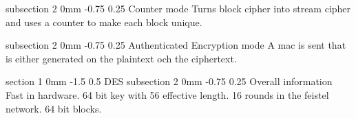 \documentclass[a4paper,11pt]{article}
\makeatletter
\renewcommand{\section}{\@startsection
   {section}%
   {1}%
   {0mm}%
   {-1.5\baselineskip}%
   {0.5\baselineskip}%
   {\sffamily\bfseries\upshape\normalsize}}%
\renewcommand{\subsection}{\@startsection
   {subsection}%
   {2}%
   {0mm}%
   {-0.75\baselineskip}%
   {0.25\baselineskip}%
   {\rmfamily\normalfont\slshape\normalsize}}%
\makeatother
\begin{document}
\subsection{Counter mode}
Turns block cipher into stream cipher and uses a counter to make each block unique. 

\subsection{Authenticated Encryption mode}
A mac is sent that is either generated on the plaintext och the ciphertext. 




\section{DES}
\subsection{Overall information}
Fast in hardware. 64 bit key with 56 effective length. 16 rounds in the feistel network. 64 bit blocks.
\end{document}
